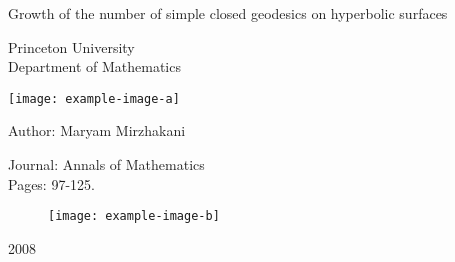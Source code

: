\documentclass[10pt, oneside]{book}
\begin{document}
	\begin{titlepage}
		\center
		\begin{large}
			\Huge{Growth of the number of simple closed geodesics on hyperbolic surfaces}
		\end{large}
		
		\vspace{2.5cm}
		
		\LARGE{Princeton University}\\
		\large{Department of Mathematics}
		
		\vspace{5mm}
		
		\texttt{[image: example-image-a]}%
		
		\vspace{3cm}
		
		\begin{minipage}{.5\textwidth}
			Author: Maryam Mirzhakani\\
		\end{minipage}
		\hfill
		\begin{minipage}{.45\textwidth}
			\flushright
			Journal: Annals of Mathematics\\
			Pages: 97-125.
		\end{minipage}
		
		\begin{figure}[H]
			\centering
			\texttt{[image: example-image-b]}%
		\end{figure}
		
		\vspace{2.5cm}
		
		\huge{2008}
	\end{titlepage}
	
\end{document}
